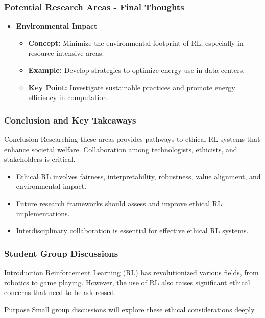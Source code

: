 \documentclass[aspectratio=169]{beamer}
\begin{document}
\begin{frame}[fragile]
  \frametitle{Potential Research Areas - Final Thoughts}
  
  \begin{itemize}
    \item \textbf{Environmental Impact}
      \begin{itemize}
        \item \textbf{Concept:} Minimize the environmental footprint of RL, especially in resource-intensive areas.
        \item \textbf{Example:} Develop strategies to optimize energy use in data centers.
        \item \textbf{Key Point:} Investigate sustainable practices and promote energy efficiency in computation.
      \end{itemize}
  \end{itemize}

\end{frame}

\begin{frame}[fragile]
  \frametitle{Conclusion and Key Takeaways}

  \begin{block}{Conclusion}
    Researching these areas provides pathways to ethical RL systems that enhance societal welfare. 
    Collaboration among technologists, ethicists, and stakeholders is critical.
  \end{block}

  \begin{itemize}
    \item Ethical RL involves fairness, interpretability, robustness, value alignment, and environmental impact.
    \item Future research frameworks should assess and improve ethical RL implementations.
    \item Interdisciplinary collaboration is essential for effective ethical RL systems.
  \end{itemize}
  
\end{frame}

\begin{frame}[fragile]
  \frametitle{Student Group Discussions}
  \begin{block}{Introduction}
    Reinforcement Learning (RL) has revolutionized various fields, from robotics to game playing. However, the use of RL also raises significant ethical concerns that need to be addressed.
  \end{block}
  \vspace{1em}
  \begin{block}{Purpose}
    Small group discussions will explore these ethical considerations deeply.
  \end{block}
\end{frame}
\end{document}
